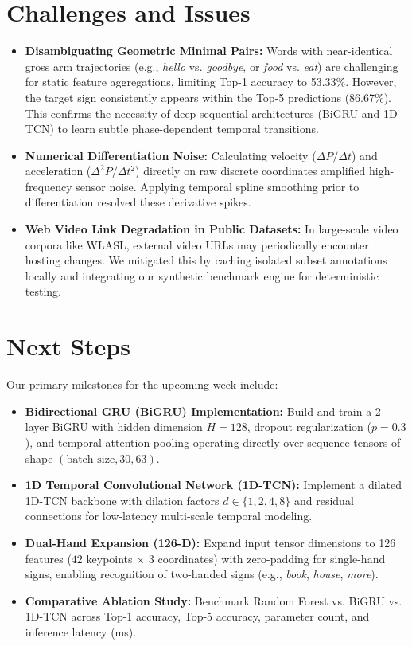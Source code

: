 \documentclass{article}
\begin{document}
\section*{Challenges and Issues}
\begin{itemize}
    \item \textbf{Disambiguating Geometric Minimal Pairs:} Words with near-identical gross arm trajectories (e.g., \textit{hello} vs. \textit{goodbye}, or \textit{food} vs. \textit{eat}) are challenging for static feature aggregations, limiting Top-1 accuracy to 53.33\%. However, the target sign consistently appears within the Top-5 predictions (86.67\%). This confirms the necessity of deep sequential architectures (BiGRU and 1D-TCN) to learn subtle phase-dependent temporal transitions.
    \item \textbf{Numerical Differentiation Noise:} Calculating velocity ($\Delta P / \Delta t$) and acceleration ($\Delta^2 P / \Delta t^2$) directly on raw discrete coordinates amplified high-frequency sensor noise. Applying temporal spline smoothing prior to differentiation resolved these derivative spikes.
    \item \textbf{Web Video Link Degradation in Public Datasets:} In large-scale video corpora like WLASL, external video URLs may periodically encounter hosting changes. We mitigated this by caching isolated subset annotations locally and integrating our synthetic benchmark engine for deterministic testing.
\end{itemize}

\section*{Next Steps}
Our primary milestones for the upcoming week include:
\begin{itemize}
    \item \textbf{Bidirectional GRU (BiGRU) Implementation:} Build and train a 2-layer BiGRU with hidden dimension $H = 128$, dropout regularization ($p = 0.3$), and temporal attention pooling operating directly over sequence tensors of shape $(\text{batch\_size}, 30, 63)$.
    \item \textbf{1D Temporal Convolutional Network (1D-TCN):} Implement a dilated 1D-TCN backbone with dilation factors $d \in \{1, 2, 4, 8\}$ and residual connections for low-latency multi-scale temporal modeling.
    \item \textbf{Dual-Hand Expansion (126-D):} Expand input tensor dimensions to 126 features ($42$ keypoints $\times$ 3 coordinates) with zero-padding for single-hand signs, enabling recognition of two-handed signs (e.g., \textit{book}, \textit{house}, \textit{more}).
    \item \textbf{Comparative Ablation Study:} Benchmark Random Forest vs. BiGRU vs. 1D-TCN across Top-1 accuracy, Top-5 accuracy, parameter count, and inference latency (ms).
\end{itemize}
\end{document}
